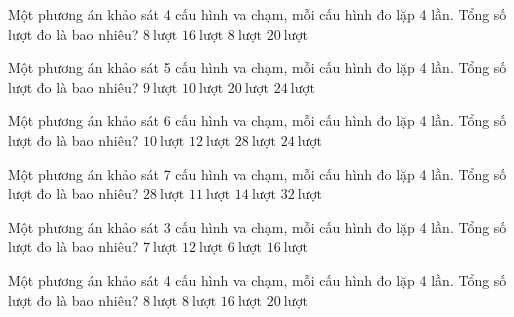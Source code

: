 \begin{ex}
Một phương án khảo sát 4 cấu hình va chạm, mỗi cấu hình đo lặp 4 lần. Tổng số lượt đo là bao nhiêu?
\choice
{$8\ \mathrm{lượt}$}
{\True $16\ \mathrm{lượt}$}
{$8\ \mathrm{lượt}$}
{$20\ \mathrm{lượt}$}
\end{ex}

\begin{ex}
Một phương án khảo sát 5 cấu hình va chạm, mỗi cấu hình đo lặp 4 lần. Tổng số lượt đo là bao nhiêu?
\choice
{$9\ \mathrm{lượt}$}
{$10\ \mathrm{lượt}$}
{\True $20\ \mathrm{lượt}$}
{$24\ \mathrm{lượt}$}
\end{ex}

\begin{ex}
Một phương án khảo sát 6 cấu hình va chạm, mỗi cấu hình đo lặp 4 lần. Tổng số lượt đo là bao nhiêu?
\choice
{$10\ \mathrm{lượt}$}
{$12\ \mathrm{lượt}$}
{$28\ \mathrm{lượt}$}
{\True $24\ \mathrm{lượt}$}
\end{ex}

\begin{ex}
Một phương án khảo sát 7 cấu hình va chạm, mỗi cấu hình đo lặp 4 lần. Tổng số lượt đo là bao nhiêu?
\choice
{\True $28\ \mathrm{lượt}$}
{$11\ \mathrm{lượt}$}
{$14\ \mathrm{lượt}$}
{$32\ \mathrm{lượt}$}
\end{ex}

\begin{ex}
Một phương án khảo sát 3 cấu hình va chạm, mỗi cấu hình đo lặp 4 lần. Tổng số lượt đo là bao nhiêu?
\choice
{$7\ \mathrm{lượt}$}
{\True $12\ \mathrm{lượt}$}
{$6\ \mathrm{lượt}$}
{$16\ \mathrm{lượt}$}
\end{ex}

\begin{ex}
Một phương án khảo sát 4 cấu hình va chạm, mỗi cấu hình đo lặp 4 lần. Tổng số lượt đo là bao nhiêu?
\choice
{$8\ \mathrm{lượt}$}
{$8\ \mathrm{lượt}$}
{\True $16\ \mathrm{lượt}$}
{$20\ \mathrm{lượt}$}
\end{ex}

